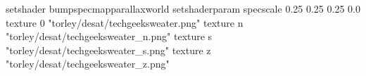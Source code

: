 setshader bumpspecmapparallaxworld
setshaderparam specscale 0.25 0.25 0.25 0.0
texture 0 "torley/desat/techgeeksweater.png"
texture n "torley/desat/techgeeksweater_n.png"
texture s "torley/desat/techgeeksweater_s.png"
texture z "torley/desat/techgeeksweater_z.png"

